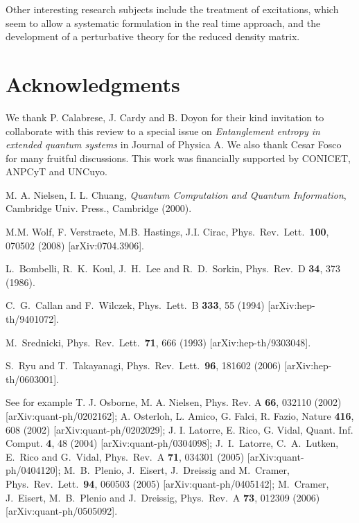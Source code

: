 \documentclass[a4paper]{article}
\begin{document}
Other interesting research subjects include the treatment of excitations, which seem to allow a systematic formulation in the real time approach, and the development of a perturbative theory for the reduced density matrix.

 \section*{Acknowledgments}
We thank P. Calabrese, J. Cardy and B. Doyon for their kind invitation to collaborate with this review to a special issue on {\sl Entanglement entropy in extended quantum systems} in Journal of Physica A. 
 We also thank Cesar Fosco for many fruitful discussions. This work was financially supported by CONICET, ANPCyT and UNCuyo. 
\begin{thebibliography}{99}


M. A. Nielsen, I. L. Chuang, {\sl Quantum Computation and Quantum Information}, Cambridge Univ. Press., Cambridge  (2000). 

   
 M.M. Wolf, F. Verstraete, M.B. Hastings, J.I. Cirac, 
   Phys.\ Rev.\ Lett.\ {\bf 100}, 070502 (2008) 
[arXiv:0704.3906].


L.~Bombelli, R.~K.~Koul, J.~H.~Lee and R.~D.~Sorkin,
 Phys.\ Rev.\ D {\bf 34}, 373 (1986).

  C.~G.~Callan and F.~Wilczek,
 Phys.\ Lett.\ B {\bf 333}, 55 (1994)
[arXiv:hep-th/9401072].


 M.~Srednicki,
 Phys.\ Rev.\ Lett.\  {\bf 71}, 666 (1993)
 [arXiv:hep-th/9303048]. 
 
  S.~Ryu and T.~Takayanagi,
  Phys.\ Rev.\ Lett.\  {\bf 96}, 181602 (2006)
  [arXiv:hep-th/0603001].

See for example T. J. Osborne, M. A. Nielsen, Phys. Rev. A {\bf  66}, 032110 (2002) [arXiv:quant-ph/0202162];
 A. Osterloh, L. Amico, G. Falci, R. Fazio, Nature {\bf 416}, 608 (2002) [arXiv:quant-ph/0202029];
 J. I. Latorre, E. Rico, G. Vidal, Quant. Inf. Comput. {\bf 4}, 48 (2004) [arXiv:quant-ph/0304098]; 
  J.~I.~Latorre, C.~A.~Lutken, E.~Rico and G.~Vidal,
  Phys.\ Rev.\  A {\bf 71}, 034301 (2005)
  [arXiv:quant-ph/0404120];
  M.~B.~Plenio, J.~Eisert, J.~Dreissig and M.~Cramer,
  Phys.\ Rev.\ Lett.\  {\bf 94}, 060503 (2005)
  [arXiv:quant-ph/0405142]; 
  M.~Cramer, J.~Eisert, M.~B.~Plenio and J.~Dreissig,
  Phys.\ Rev.\  A {\bf 73}, 012309 (2006)
  [arXiv:quant-ph/0505092]. 
  

\end{thebibliography}
\end{document}
